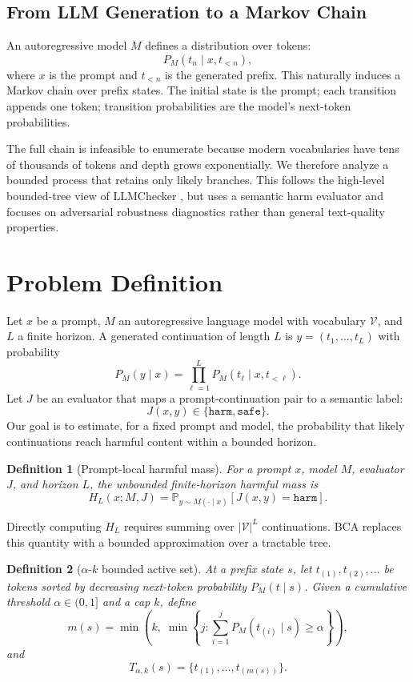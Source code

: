 \documentclass[11pt]{article}
\newtheorem{definition}{Definition}
\newcommand{\Prob}{\mathbb{P}}
\newcommand{\calV}{\mathcal{V}}
\newcommand{\harm}{\texttt{harm}}
\newcommand{\safe}{\texttt{safe}}
\newcommand{\BCA}{\textsc{BCA}}
\begin{document}
\subsection{From LLM Generation to a Markov Chain}

An autoregressive model $M$ defines a distribution over tokens:
\[
  P_M(t_n \mid x,t_{<n}),
\]
where $x$ is the prompt and $t_{<n}$ is the generated prefix.  This naturally induces a Markov chain over prefix states.  The initial state is the prompt; each transition appends one token; transition probabilities are the model's next-token probabilities.

The full chain is infeasible to enumerate because modern vocabularies have tens of thousands of tokens and depth grows exponentially.  We therefore analyze a bounded process that retains only likely branches.  This follows the high-level bounded-tree view of LLMChecker \cite{gross2025llmchecker}, but uses a semantic harm evaluator and focuses on adversarial robustness diagnostics rather than general text-quality properties.

\section{Problem Definition}
\label{sec:problem}

Let $x$ be a prompt, $M$ an autoregressive language model with vocabulary $\calV$, and $L$ a finite horizon.  A generated continuation of length $L$ is $y = (t_1,\ldots,t_L)$ with probability
\[
  P_M(y\mid x)
  =
  \prod_{\ell=1}^{L}
  P_M(t_\ell \mid x,t_{<\ell}).
\]
Let $J$ be an evaluator that maps a prompt-continuation pair to a semantic label:
\[
  J(x,y) \in \{\harm,\safe\}.
\]
Our goal is to estimate, for a fixed prompt and model, the probability that likely continuations reach harmful content within a bounded horizon.

\begin{definition}[Prompt-local harmful mass]
For a prompt $x$, model $M$, evaluator $J$, and horizon $L$, the unbounded finite-horizon harmful mass is
\[
  H_L(x;M,J)
  =
  \Prob_{y\sim M(\cdot\mid x)}
  \left[J(x,y)=\harm\right].
\]
\end{definition}

Directly computing $H_L$ requires summing over $|\calV|^L$ continuations.  \BCA{} replaces this quantity with a bounded approximation over a tractable tree.

\begin{definition}[$\alpha$-$k$ bounded active set]
At a prefix state $s$, let $t_{(1)},t_{(2)},\ldots$ be tokens sorted by decreasing next-token probability $P_M(t\mid s)$.  Given a cumulative threshold $\alpha\in(0,1]$ and a cap $k$, define
\[
  m(s)
  =
  \min\!\left(k,\; \min\!\left\{j : \sum_{i=1}^{j} P_M(t_{(i)}\mid s) \geq \alpha\right\}\right),
\]
and
\[
  T_{\alpha,k}(s)
  =
  \{t_{(1)},\ldots,t_{(m(s))}\}.
\]
\end{definition}
\end{document}
